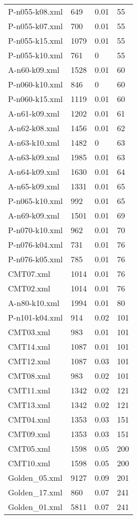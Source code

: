 \documentclass[12pt]{article}
\begin{document}
\begin{appendices}
\begin{table}[]
\begin{tabular}{llll}
	P-n055-k08.xml & 649 & 0.01 & 55 \\
	P-n055-k07.xml & 700 & 0.01 & 55 \\
	P-n055-k15.xml & 1079 & 0.01 & 55 \\
	P-n055-k10.xml & 761 & 0 & 55 \\
	A-n60-k09.xml & 1528 & 0.01 & 60 \\
	P-n060-k10.xml & 846 & 0 & 60 \\
	P-n060-k15.xml & 1119 & 0.01 & 60 \\
	A-n61-k09.xml & 1202 & 0.01 & 61 \\
	A-n62-k08.xml & 1456 & 0.01 & 62 \\
	A-n63-k10.xml & 1482 & 0 & 63 \\
	A-n63-k09.xml & 1985 & 0.01 & 63 \\
	A-n64-k09.xml & 1630 & 0.01 & 64 \\
	A-n65-k09.xml & 1331 & 0.01 & 65 \\
	P-n065-k10.xml & 992 & 0.01 & 65 \\
	A-n69-k09.xml & 1501 & 0.01 & 69 \\
	P-n070-k10.xml & 962 & 0.01 & 70 \\
	P-n076-k04.xml & 731 & 0.01 & 76 \\
	P-n076-k05.xml & 785 & 0.01 & 76 \\
	CMT07.xml & 1014 & 0.01 & 76 \\
	CMT02.xml & 1014 & 0.01 & 76 \\
	A-n80-k10.xml & 1994 & 0.01 & 80 \\
	P-n101-k04.xml & 914 & 0.02 & 101 \\
	CMT03.xml & 983 & 0.01 & 101 \\
	CMT14.xml & 1087 & 0.01 & 101 \\
	CMT12.xml & 1087 & 0.03 & 101 \\
	CMT08.xml & 983 & 0.02 & 101 \\
	CMT11.xml & 1342 & 0.02 & 121 \\
	CMT13.xml & 1342 & 0.02 & 121 \\
	CMT04.xml & 1353 & 0.03 & 151 \\
	CMT09.xml & 1353 & 0.03 & 151 \\
	CMT05.xml & 1598 & 0.05 & 200 \\
	CMT10.xml & 1598 & 0.05 & 200 \\
	Golden\_05.xml & 9127 & 0.09 & 201 \\
	Golden\_17.xml & 860 & 0.07 & 241 \\
	Golden\_01.xml & 5811 & 0.07 & 241 \\

\end{tabular}
\end{table}
\end{appendices}
\end{document}
